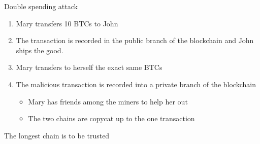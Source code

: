 \documentclass{beamer}
\begin{document}
\begin{frame}{Double spending attack}
\begin{enumerate}
\item Mary transfers 10 BTCs to John
\item The transaction is recorded in the public branch of the blockchain and John ships the good.
\item Mary transfers to herself the exact same BTCs
\item The malicious transaction is recorded into a private branch of the blockchain
\begin{itemize}
  \scriptsize
\item Mary has friends among the miners to help her out
\item The two chains are copycat up to the one transaction
\end{itemize}
\end{enumerate}
\begin{tcolorbox}[enhanced,drop shadow, title=Fact (Bitcoin has only one rule)]
The longest chain is to be trusted
\end{tcolorbox}
\end{frame}
\end{document}
